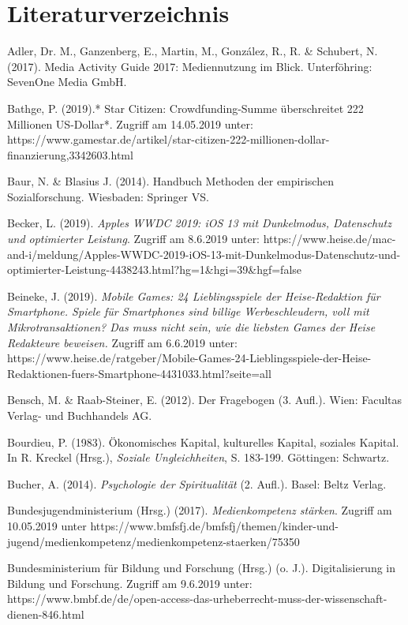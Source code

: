 \documentclass[
  a4paper,
  DIV=11,
  numbers=noendperiod,
  onecolumn,
  oneside,
  a4paper]{scrartcl}
\begin{document}
\section{Literaturverzeichnis}\label{literaturverzeichnis}

Adler, Dr. M., Ganzenberg, E., Martin, M., González, R., R. \& Schubert,
N. (2017). Media Activity Guide 2017: Mediennutzung im Blick.
Unterföhring: SevenOne Media GmbH.

Bathge, P. (2019).* Star Citizen: Crowdfunding-Summe überschreitet 222
Millionen US-Dollar*. Zugriff am 14.05.2019 unter:
https://www.gamestar.de/artikel/star-citizen-222-millionen-dollar-finanzierung,3342603.html

Baur, N. \& Blasius J. (2014). Handbuch Methoden der empirischen
Sozialforschung. Wiesbaden: Springer VS.

Becker, L. (2019). \emph{Apples WWDC 2019: iOS 13 mit Dunkelmodus,
Datenschutz und optimierter Leistung}. Zugriff am 8.6.2019 unter:
https://www.heise.de/mac-and-i/meldung/Apples-WWDC-2019-iOS-13-mit-Dunkelmodus-Datenschutz-und-optimierter-Leistung-4438243.html?hg=1\&hgi=39\&hgf=false

Beineke, J. (2019). \emph{Mobile Games: 24 Lieblingsspiele der
Heise-Redaktion für Smartphone. Spiele für Smartphones sind billige
Werbeschleudern, voll mit Mikrotransaktionen? Das muss nicht sein, wie
die liebsten Games der Heise Redakteure beweisen.} Zugriff am 6.6.2019
unter:
https://www.heise.de/ratgeber/Mobile-Games-24-Lieblingsspiele-der-Heise-Redaktionen-fuers-Smartphone-4431033.html?seite=all

Bensch, M. \& Raab-Steiner, E. (2012). Der Fragebogen (3. Aufl.). Wien:
Facultas Verlag- und Buchhandels AG.

Bourdieu, P. (1983). Ökonomisches Kapital, kulturelles Kapital, soziales
Kapital. In R. Kreckel (Hrsg.), \emph{Soziale Ungleichheiten}, S.
183-199. Göttingen: Schwartz.

Bucher, A. (2014). \emph{Psychologie der Spiritualität} (2. Aufl.).
Basel: Beltz Verlag.

Bundesjugendministerium (Hrsg.) (2017). \emph{Medienkompetenz stärken}.
Zugriff am 10.05.2019 unter
https://www.bmfsfj.de/bmfsfj/themen/kinder-und-jugend/medienkompetenz/medienkompetenz-staerken/75350

Bundesministerium für Bildung und Forschung (Hrsg.) (o. J.).
Digitalisierung in Bildung und Forschung. Zugriff am 9.6.2019 unter:
https://www.bmbf.de/de/open-access-das-urheberrecht-muss-der-wissenschaft-dienen-846.html
\end{document}
